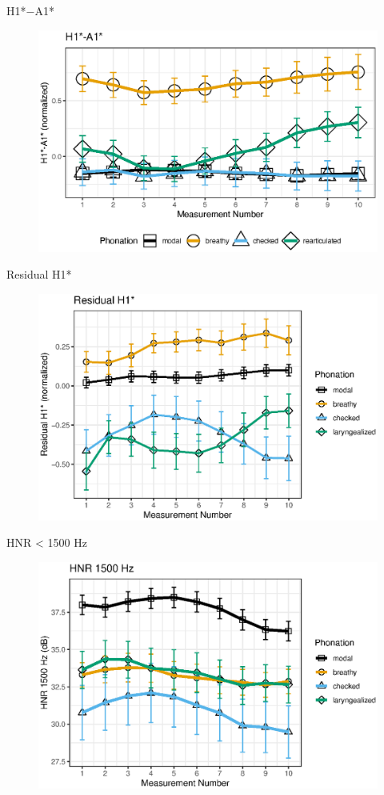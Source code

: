 \documentclass[professionalfonts]{beamer}
\begin{document}
\begin{frame}{H1*$-$A1*}
  \begin{figure}
    \centering
    \includegraphics[width = 0.8\linewidth]{images/h1a1_line.eps}
  \end{figure}
\end{frame}

\begin{frame}{Residual H1*}
  \begin{figure}
    \centering
    \includegraphics[width = 0.8\linewidth]{images/slz_residual_h1c.eps}
  \end{figure}
\end{frame}

\begin{frame}{HNR < 1500 Hz}
  \begin{figure}
    \centering
    \includegraphics[width = 0.8\linewidth]{images/slz_hnr15.eps}
  \end{figure}
\end{frame}
\end{document}
